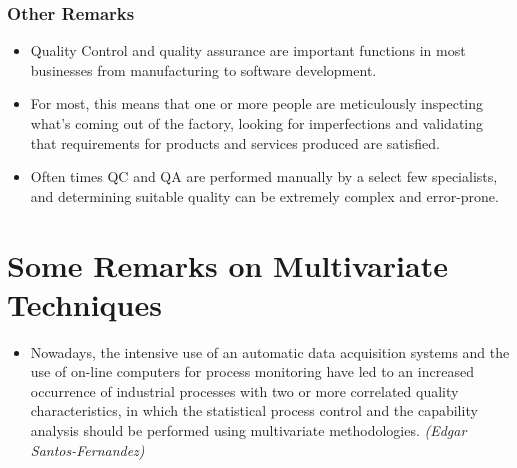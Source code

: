 \documentclass[]{report}
\begin{document}
	\subsubsection{Other Remarks}
	{\large
		\begin{itemize}
			\item Quality Control and quality assurance are important functions in most businesses from manufacturing to software development. 
			\item For most, this means that one or more people are meticulously inspecting what's coming out of the factory, looking for imperfections and validating that requirements for products and services produced are satisfied. \item Often times QC and QA are performed manually by a select few specialists, and determining suitable quality can be extremely complex and error-prone.
		\end{itemize}
\section{Some Remarks on Multivariate Techniques}
{
	\large
	
	\begin{itemize}
		\item Nowadays, the intensive use of an automatic data acquisition systems and the use of
		on-line computers for process monitoring have led to an increased occurrence of
		industrial processes with two or more correlated quality characteristics, in which
		the statistical process control and the capability analysis should be performed using
		multivariate methodologies. \textit{(Edgar Santos-Fernandez)}
	\end{itemize}
}
}
\end{document}
